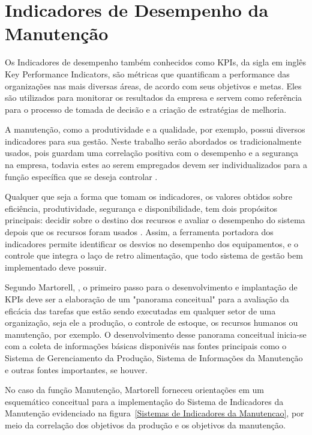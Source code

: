 \chapter{Indicadores de Desempenho da Manutenção}
\label{indicadores}

Os Indicadores de desempenho também conhecidos como KPIs, da sigla em inglês Key Performance Indicators, são métricas que quantificam a performance das organizações nas mais diversas áreas, de acordo com seus objetivos e metas. Eles são utilizados para monitorar os resultados da empresa e servem como referência para o processo de tomada de decisão e a criação de estratégias de melhoria. 

A manutenção, como a produtividade e a qualidade, por exemplo, possui diversos indicadores para sua gestão. Neste trabalho serão abordados os tradicionalmente usados, pois guardam uma correlação positiva com o desempenho e a segurança na empresa, todavia estes ao serem empregados devem ser individualizados para a função específica que se deseja controlar \cite{martorell1999}.

Qualquer que seja a forma que tomam os indicadores, os valores obtidos sobre eficiência, produtividade, segurança e disponibilidade, tem dois propósitos principais: decidir sobre o destino dos recursos e avaliar o desempenho do sistema depois que os recursos foram usados \cite{lofsten1998}. Assim, a ferramenta portadora dos indicadores permite identificar os desvios no desempenho dos equipamentos, e o controle que integra o laço de retro alimentação, que todo sistema de gestão bem implementado deve possuir. 

Segundo Martorell, \cite{martorell1999}, o primeiro passo para o desenvolvimento e implantação de KPIs deve ser a elaboração de um "panorama conceitual" para a avaliação da eficácia das tarefas que estão sendo executadas em qualquer setor de uma organização, seja ele a produção, o controle de estoque, os recursos humanos ou manutenção, por exemplo. O desenvolvimento desse panorama conceitual inicia-se com a coleta de informações básicas disponivéis nas fontes principais como o Sistema de Gerenciamento da Produção, Sistema de Informações da Manutenção e outras fontes importantes, se houver.

No caso da função Manutenção, Martorell forneceu orientações em um esquemático conceitual para a implementação do Sistema de Indicadores da Manutenção evidenciado na figura~\ref{Sistemas de Indicadores da Manutencao}, por meio da correlação dos objetivos da produção e os objetivos da manutenção.

